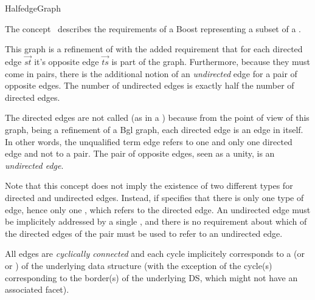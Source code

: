 
\begin{ccRefConcept}{HalfedgeGraph}


\ccDefinition

The concept \ccRefName\ describes the requirements of a
Boost 
representing a subset of a .

This graph is a refinement of  with the
added requirement that for each directed edge $\overrightarrow{st}$
it's opposite edge $\overrightarrow{ts}$ is part of the graph.
Furthermore, because they must come in pairs, there is the additional
notion of an {\em undirected} edge for a pair of opposite edges.
The number of undirected edges is exactly half the number of directed edges.

The directed edges are not called  (as in a
) because from the point of view of this graph, being
a refinement of a {\sc Bgl} graph, each directed edge is an
edge in itself. In other words, the unqualified term edge
refers to one and only one directed edge and not to a pair. The
pair of opposite edges, seen as a unity, is an {\em undirected edge}.
 
Note that this concept does not imply the existence of two different types
for directed and undirected edges. Instead, if specifies that there is only one type of edge,
hence only one , which refers to the directed edge.
An undirected edge must be implicitely addressed by a single ,
and there is no requirement about which of the directed edges of the pair must
be used to refer to an undirected edge.

All edges are {\em cyclically connected} and each cycle implicitely
corresponds to a  (or  or ) of the
underlying data structure (with the exception of the cycle(s)
corresponding to the border(s) of the underlying DS, which might not
have an associated facet).



\end{ccRefConcept}
